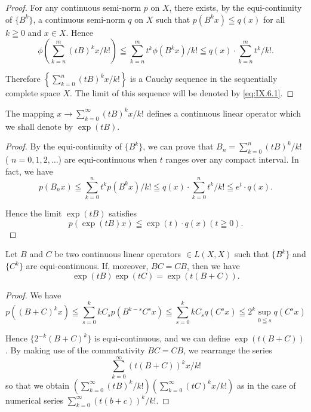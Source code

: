 \begin{proof}
 For any continuous semi-norm $p$ on $X$, there exists, by the equi-continuity of $\{B^k\}$, a continuous semi-norm $q$ on $X$ such that $p(B^k x) \leqq q(x)$ for all $k \geqq 0$ and $x \in X$. Hence 
\[
\phi \left(\sum\limits_{k=n} ^{m} (t B) ^{k} x / k!\right) \leqq \sum\limits_{k=n} ^{m} t ^{k} \phi (B ^{k} x) / k! \leqq q (x) \cdot \sum\limits_{k=n} ^{m} t ^{k} / k!. \]

Therefore $\left\{\sum\limits_{k=0}^{n}(tB)^{k}x/k!\right\}$ is a Cauchy sequence in the sequentially complete space $X$. The limit of this sequence will be denoted by \eqref{eq:IX.6.1}. 
\end{proof}

\begin{corollary}\label{cor:IX.6.Corollary.1} The mapping $x \to \sum\limits_{k=0}^{\infty} (tB)^k x / k!$ defines a continuous linear operator which we shall denote by $\exp(tB)$. 
\end{corollary}

\begin{proof}
 By the equi-continuity of $\{B^k\}$, we can prove that $B_n = \sum\limits_{k=0}^{n} (tB)^k / k!$ ( $n = 0, 1, 2, \ldots$) are equi-continuous when $t$ ranges over any compact interval. In fact, we have 
\[
p (B _{n} x) \leqq \sum\limits_{k=0} ^{n} t ^{k} p (B ^{k} x) / k! \leqq q (x) \cdot \sum\limits_{k=0} ^{n} t ^{k} / k! \leqq e ^{t} \cdot q (x). \]

Hence the limit $\exp (tB)$ satisfies 
\begin{equation}\label{eq:IX.6.2}
p (\exp (t B) x) \leqq \exp (t) \cdot q (x) (t \geqq 0).
\end{equation}
\end{proof}

\begin{corollary}\label{cor:IX.6.Corollary.2} Let $B$ and $C$ be two continuous linear operators $\in L(X, X)$ such that $\{B^k\}$ and $\{C^k\}$ are equi-continuous. If, moreover, $BC = CB$, then we have 
\begin{equation}\label{eq:IX.6.3}
\exp (t B) \exp (t C) = \exp (t (B + C)).
\end{equation}
\end{corollary}

\begin{proof}
 We have 
\[
p \left((B + C) ^{k} x\right) \leqq \sum\limits_{s=0} ^{k} k C _{s} p \left(B ^{k-s} C ^{s} x\right) \leqq \sum\limits_{s=0} ^{k} k C _{s} q \left(C ^{s} x\right) \leqq 2 ^{k} \sup\limits _{0 \leqq s} q \left(C ^{s} x\right) \]

Hence $\{2^{-k}(B + C)^k\}$ is equi-continuous, and we can define $\exp(t(B + C))$. By making use of the commutativity $BC = CB$, we rearrange the series 
\[
\sum\limits_{k=0} ^{\infty} (t (B + C)) ^{k} x / k!
\]
so that we obtain $\left(\sum\limits_{k=0}^{\infty}(tB)^{k}/k!\right)\left(\sum\limits_{k=0}^{\infty}(tC)^{k}x/k!\right)$ as in the case of numerical series $\sum\limits_{k=0}^{\infty}(t(b+c))^{k}/k!$. 
\end{proof}


